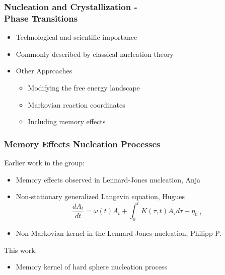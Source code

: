 \documentclass[smaller,notes=hide]{beamer}
\newlength{\wideitemsep}
\let\olditem\item
\renewcommand{\item}{\setlength{\itemsep}{\wideitemsep}\olditem}
\begin{document}
\begin{frame}
\begin{columns}
\end{columns}
\end{frame}



\begin{frame}
\frametitle{Nucleation and Crystallization - \\ \hfill Phase Transitions}
\begin{itemize}
\item Technological and scientific importance
\item Commonly described by classical nucleation theory\\
\vspace{0.5cm}
\item Other Approaches
\begin{itemize}
\item Modifying the free energy landscape
\item Markovian reaction coordinates
\item Including memory effects
\end{itemize}
\end{itemize}
\end{frame}

\fi



\begin{frame}
\frametitle{Memory Effects Nucleation Processes}
Earlier work in the group:
\vspace{0.1cm}
\begin{itemize}
\item Memory effects observed in Lennard-Jones nucleation, Anja\cite{Kuhnbold2019}
\vspace{0.5cm}
\item Non-stationary generalized Langevin equation, Hugues\cite{MeyerThesis}
\begin{equation*}
\label{eqn:EOM_A}
  \frac{d A_{t}}{dt} = \omega (t) A_{t} + \int_{0}^{t} K(\tau, t) A_{\tau} d\tau + \eta_{0,t}
\end{equation*}
\item Non-Markovian kernel in the Lennard-Jones nucleation, Philipp P.\cite{ThesisPhilipp}
\end{itemize}
\vspace{0.5cm}
This work:
\vspace{0.1cm}
\begin{itemize}
\item Memory kernel of hard sphere nucleation process
\end{itemize}
\end{frame}
\end{document}

